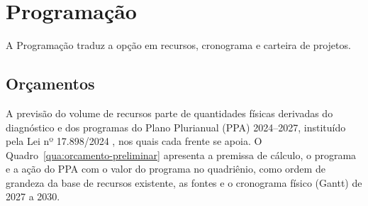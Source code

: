 \documentclass[
	12pt,				%
	openright,			%
	oneside,			%
	a4paper,			%
	chapter=TITLE,		%
	section=TITLE,		%
	english,			%
	french,				%
	spanish,			%
	brazil,				%
 ]{abntex2}
\begin{document}
\section{Programação}
A Programação traduz a opção em recursos, cronograma e carteira de projetos.

\subsection{Orçamentos}
A previsão do volume de recursos parte de quantidades físicas derivadas do
diagnóstico e dos programas do Plano Plurianual (PPA) 2024--2027, instituído pela
Lei nº 17.898/2024 \cite{saopaulo2024ppa}, nos quais cada frente se apoia. O
Quadro~\ref{qua:orcamento-preliminar} apresenta a premissa de cálculo, o
programa e a ação do PPA com o valor do programa no quadriênio, como ordem de
grandeza da base de recursos existente, as fontes e o cronograma físico (Gantt)
de 2027 a 2030.
\end{document}
